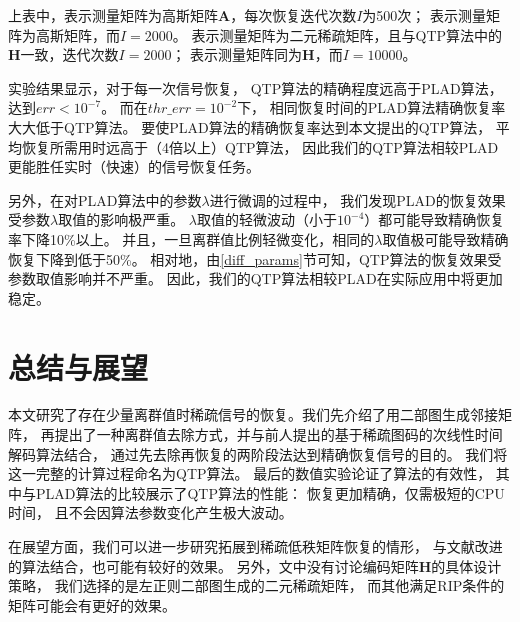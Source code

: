 \documentclass[AutoFakeBold]{LZUThesis}
\begin{document}
上表中，表示测量矩阵为高斯矩阵$\mathbf{A}$，每次恢复迭代次数$I$为500次；
表示测量矩阵为高斯矩阵，而$I = 2000$。
表示测量矩阵为二元稀疏矩阵，且与QTP算法中的$\mathbf{H}$一致，迭代次数$I=2000$；
表示测量矩阵同为$\mathbf{H}$，而$I=10000$。

实验结果显示，对于每一次信号恢复，
QTP算法的精确程度远高于PLAD算法，达到$err < 10^{-7}$。
而在$thr\_err = 10^{-2}$下，
相同恢复时间的PLAD算法精确恢复率大大低于QTP算法。
要使PLAD算法的精确恢复率达到本文提出的QTP算法，
平均恢复所需用时远高于（4倍以上）QTP算法，
因此我们的QTP算法相较PLAD更能胜任实时（快速）的信号恢复任务。

另外，在对PLAD算法中的参数$\lambda$进行微调的过程中，
我们发现PLAD的恢复效果受参数$\lambda$取值的影响极严重。
$\lambda$取值的轻微波动（小于$10^{-4}$）都可能导致精确恢复率下降10\%以上。
并且，一旦离群值比例轻微变化，相同的$\lambda$取值极可能导致精确恢复下降到低于50\%。
相对地，由\ref{diff_params}节可知，QTP算法的恢复效果受参数取值影响并不严重。
因此，我们的QTP算法相较PLAD在实际应用中将更加稳定。

\chapter{总结与展望}
\label{5}

本文研究了存在少量离群值时稀疏信号的恢复。我们先介绍了用二部图生成邻接矩阵，
再提出了一种离群值去除方式，并与前人提出的基于稀疏图码的次线性时间解码算法结合，
通过先去除再恢复的两阶段法达到精确恢复信号的目的。
我们将这一完整的计算过程命名为QTP算法。
最后的数值实验论证了算法的有效性，
其中与PLAD算法的比较展示了QTP算法的性能：
恢复更加精确，仅需极短的CPU时间，
且不会因算法参数变化产生极大波动。

在展望方面，我们可以进一步研究拓展到稀疏低秩矩阵恢复的情形，
与文献\cite{10120641}改进的算法结合，也可能有较好的效果。
另外，文中没有讨论编码矩阵$\mathbf{H}$的具体设计策略，
我们选择的是左正则二部图生成的二元稀疏矩阵，
而其他满足RIP条件的矩阵可能会有更好的效果。


% 


\backmatter


\printbib
\end{document}
